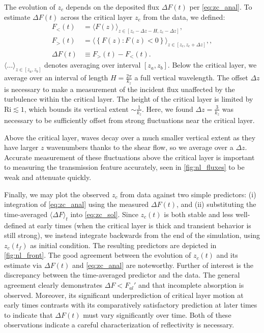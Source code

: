 \documentclass[
        fleqn,
        usenatbib,
    ]{mnras}
\newcommand*{\ev}[1]{\langle#1\rangle}
\newcommand*{\z}[1]{\left\{#1\right\}}
\begin{document}
The evolution of $z_c$ depends on the deposited flux $\Delta F(t)$ per
\autoref{eq:zc_anal}. To estimate $\Delta F(t)$ across the critical layer $z_c$
from the data, we defined:
\begin{align}
    F_{<}(t) &= \ev{F(z)}_{z \in [z_c - \Delta z - H, z_c - \Delta z]}
        ,\label{eq:sbelow_def}\\
    F_>(t) &= \ev{\z{F(z): F(z) < 0}}_{z \in [z_c, z_c + \Delta z]},
        \label{eq:sabove_def},\\
    \Delta F(t) &\equiv F_>(t) - F_{<}(t).\label{eq:ds_def}
\end{align}
$\ev{\dots}_{z \in [z_a, z_b]}$ denotes averaging over interval $[z_a, z_b]$.
Below the critical layer, we average over an interval of length $H =
\frac{2\pi}{k_{z}}$ a full vertical wavelength. The offset $\Delta z$ is
necessary to make a measurement of the incident flux unaffected by the
turbulence within the critical layer. The height of the critical layer is
limited by $\mathrm{Ri} \lesssim 1$, which bounds its vertical extent $\sim
\frac{1}{k_{z}}$. Here, we found $\Delta z = \frac{3}{k_z}$ was necessary to be
sufficiently offset from strong fluctuations near the critical layer.

Above the critical layer, waves decay over a much smaller vertical extent as
they have larger $z$ wavenumbers thanks to the shear flow, so we average over a
$\Delta z$. Accurate measurement of these fluctuations above the critical layer
is important to measuring the transmission feature accurately, seen in
\autoref{fig:nl_fluxes} to be weak and attenuate quickly.

Finally, we may plot the observed $z_c$ from data against two simple predictors:
(i) integration of \autoref{eq:zc_anal} using the measured $\Delta F(t)$, and
(ii) substituting the time-averaged $\ev{\Delta F}_t$ into \autoref{eq:zc_sol}.
Since $z_c(t)$ is both stable and less well-defined at early times (when the
critical layer is thick and transient behavior is still strong), we instead
integrate backwards from the end of the simulation, using $z_c(t_f)$ as initial
condition. The resulting predictors are depicted in \autoref{fig:nl_front}. The
good agreement between the evolution of $z_c(t)$ and its estimate via $\Delta
F(t)$ and \autoref{eq:zc_anal} are noteworthy. Further of interest is the
discrepancy between the time-averaged predictor and the data. The general
agreement clearly demonstrates $\Delta F < F_{al}'$ and that incomplete
absorption is observed. Moreover, its significant underprediction of critical
layer motion at early times contrasts with its comparatively satisfactory
prediction at later times to indicate that $\Delta F(t)$ must vary significantly
over time. Both of these observations indicate a careful characterization of
reflectivity is necessary.
\end{document}
